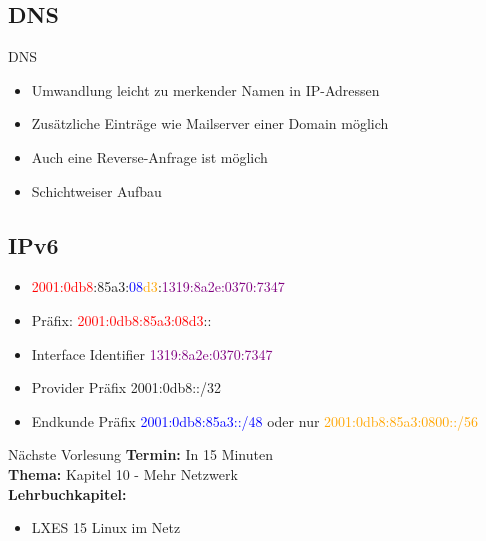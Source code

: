 \documentclass[aspectratio=43]{beamer}
\begin{document}
\subsection{DNS}
\begin{frame} 

	\begin{block}{DNS}
	\begin{itemize}
	\item Umwandlung leicht zu merkender Namen in IP-Adressen
	\item Zusätzliche Einträge wie Mailserver einer Domain möglich
	\item Auch eine Reverse-Anfrage ist möglich
	\item Schichtweiser Aufbau
	\end{itemize}
	\end{block}
	
\end{frame}

\subsection{IPv6}
\begin{frame} 
	\begin{block}{} 
	\begin{itemize}
	\item \textcolor{red}{2001:0db8}:\textcolor{green!50!black}{85a3}:\textcolor{blue}{08}\textcolor{orange}{d3}:\textcolor{purple}{1319:8a2e:0370:7347}
	\item Präfix: \textcolor{red}{2001:0db8:85a3:08d3}::
	\item Interface Identifier \textcolor{purple}{1319:8a2e:0370:7347}
	\item Provider Präfix \textcolor{green!50!black}{2001:0db8::/32}
	\item Endkunde Präfix    \textcolor{blue}{2001:0db8:85a3::/48} oder nur \textcolor{orange}{2001:0db8:85a3:0800::/56} 
	\end{itemize}
	\end{block}
\end{frame}


\begin{frame}[plain]
\begin{alertblock}{Nächste Vorlesung}
\textbf{Termin:} In 15 Minuten\\
\textbf{Thema:} Kapitel 10 - Mehr Netzwerk \\
\textbf{Lehrbuchkapitel:} 
\begin{itemize}
\item LXES 15 Linux im Netz 
\end{itemize}
\end{alertblock}
\end{frame}

\materialframe
\end{document}
